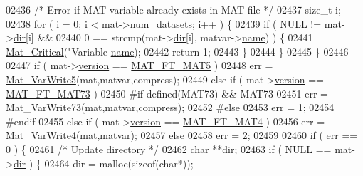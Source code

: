 \begin{DoxyCode}
{{{{{{{{{{{{{{{{{{{{{{{{{{{{{{{{{{{{{{{{{{{02436         \textcolor{comment}{/* Error if MAT variable already exists in MAT file */}
02437         \textcolor{keywordtype}{size\_t} i;
02438         \textcolor{keywordflow}{for} ( i = 0; i < mat->\hyperlink{struct__mat__t_af37d0ba323e65edb27ecd5a2f766a3a4}{num\_datasets}; i++ ) \{
02439             \textcolor{keywordflow}{if} ( NULL != mat->\hyperlink{struct__mat__t_a1bc6c604459d0787801d5e53d365684c}{dir}[i] &&
02440                 0 == strcmp(mat->\hyperlink{struct__mat__t_a1bc6c604459d0787801d5e53d365684c}{dir}[i], matvar->\hyperlink{group___m_a_t_a5d4b55b041e3b4fb50c04337f05ad909}{name}) ) \{
02441                 \hyperlink{group__mat__util_gaf51f2bfbb5580f575e4dd79757e2b80c}{Mat\_Critical}(\textcolor{stringliteral}{"Variable %
      \hyperlink{group___m_a_t_a5d4b55b041e3b4fb50c04337f05ad909}{name});
02442                 \textcolor{keywordflow}{return} 1;
02443             \}
02444         \}
02445     \}
02446 
02447     \textcolor{keywordflow}{if} ( mat->\hyperlink{struct__mat__t_a729c2bc0afc97485057a5af425635b1a}{version} == \hyperlink{group___m_a_t_ggad03442b8378999189d510e3745c702b7a31ade1f6989411dc0299007e2c7d33b2}{MAT\_FT\_MAT5} )
02448         err = \hyperlink{mat5_8c_a4d546a62c4b429d9b94fe873015e6a24}{Mat\_VarWrite5}(mat,matvar,compress);
02449     \textcolor{keywordflow}{else} \textcolor{keywordflow}{if} ( mat->\hyperlink{struct__mat__t_a729c2bc0afc97485057a5af425635b1a}{version} == \hyperlink{group___m_a_t_ggad03442b8378999189d510e3745c702b7a765c5d1d5038947646260dc82483517e}{MAT\_FT\_MAT73} )
02450 \textcolor{preprocessor}{#if defined(MAT73) && MAT73}
02451         err = Mat\_VarWrite73(mat,matvar,compress);
02452 \textcolor{preprocessor}{#else}
02453         err = 1;
02454 \textcolor{preprocessor}{#endif}
02455     \textcolor{keywordflow}{else} \textcolor{keywordflow}{if} ( mat->\hyperlink{struct__mat__t_a729c2bc0afc97485057a5af425635b1a}{version} == \hyperlink{group___m_a_t_ggad03442b8378999189d510e3745c702b7a858b4f5da65548219b1c3ad47aa478d3}{MAT\_FT\_MAT4} )
02456         err = \hyperlink{mat4_8c_aa19d44f9375c3f316de3c288642b42c3}{Mat\_VarWrite4}(mat,matvar);
02457     \textcolor{keywordflow}{else}
02458         err = 2;
02459 
02460     \textcolor{keywordflow}{if} ( err == 0 ) \{
02461         \textcolor{comment}{/* Update directory */}
02462         \textcolor{keywordtype}{char} **dir;
02463         \textcolor{keywordflow}{if} ( NULL == mat->\hyperlink{struct__mat__t_a1bc6c604459d0787801d5e53d365684c}{dir} ) \{
02464             dir = malloc(\textcolor{keyword}{sizeof}(\textcolor{keywordtype}{char}*));
}}}}}}}}}}}}}}}}}}}}}}}}}}}}}}}}}}}}}}}}}}}}
\end{DoxyCode}
